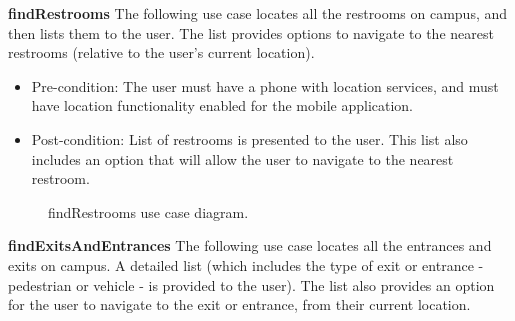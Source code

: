 \documentclass[12pt,a4paper]{article}
\begin{document}

			\textbf{findRestrooms}
			The following use case locates all the restrooms on campus, and then lists them to the user. The list provides     			options to navigate to the nearest restrooms (relative to the user's current location).

			\begin{itemize}
			\item Pre-condition: The user must have a phone with location services, and must have location functionality  						  enabled for the mobile application.
			\item Post-condition: List of restrooms is presented to the user. This list also includes an option that will 						  allow the user to navigate to the nearest restroom.
			\end{itemize}

			\begin{figure}[ht!]
				\caption \newline findRestrooms use case diagram.
			\end{figure}

			\textbf{findExitsAndEntrances}
			The following use case locates all the entrances and exits on campus. A detailed list (which includes the type of 				exit or entrance - pedestrian or vehicle - is provided to the user). The list also provides an option for the user 			to navigate to the exit or entrance, from their current location.


\end{document}
\end{itemize}
\end{document}
